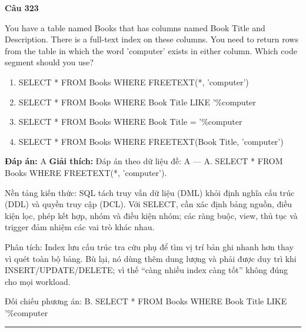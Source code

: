 \documentclass[11pt,a4paper]{article}
\newenvironment{question}[1]{%
  \par\vspace{1em}\noindent\textbf{\large Câu #1}\par\vspace{0.4em}
}{%
  \par\vspace{1em}\hrule\vspace{0.6em}
}
\newenvironment{choices}{%
  \begin{enumerate}[label=\textbf{\Alph*.},leftmargin=2.2em,itemsep=2pt,topsep=3pt]
}{%
  \end{enumerate}
}
\newcommand{\choice}{\item}
\begin{document}
\begin{question}{323}
You have a table named Books that has columns named Book Title and Description. There is a full-text index on these columns. You need to return rows from the table in which the word 'computer' exists in either column. Which code segment should you use?
\begin{choices}
\choice SELECT * FROM Books WHERE FREETEXT(*, 'computer')
\choice SELECT * FROM Books WHERE Book Title LIKE '\%computer%
\choice SELECT * FROM Books WHERE Book Title = '\%computer%
\choice SELECT * FROM Books WHERE FREETEXT(Book Title, 'computer')
\end{choices}
\textbf{Đáp án:} A
\textbf{Giải thích:} Đáp án theo dữ liệu đề: A — A. SELECT * FROM Books WHERE FREETEXT(*, 'computer').

Nền tảng kiến thức: SQL tách truy vấn dữ liệu (DML) khỏi định nghĩa cấu trúc (DDL) và quyền truy cập (DCL). Với SELECT, cần xác định bảng nguồn, điều kiện lọc, phép kết hợp, nhóm và điều kiện nhóm; các ràng buộc, view, thủ tục và trigger đảm nhiệm các vai trò khác nhau.

Phân tích: Index lưu cấu trúc tra cứu phụ để tìm vị trí bản ghi nhanh hơn thay vì quét toàn bộ bảng. Bù lại, nó dùng thêm dung lượng và phải được duy trì khi INSERT/UPDATE/DELETE; vì thế “càng nhiều index càng tốt” không đúng cho mọi workload.

Đối chiếu phương án: B. SELECT * FROM Books WHERE Book Title LIKE '\%computer%
\end{question}
\end{document}
